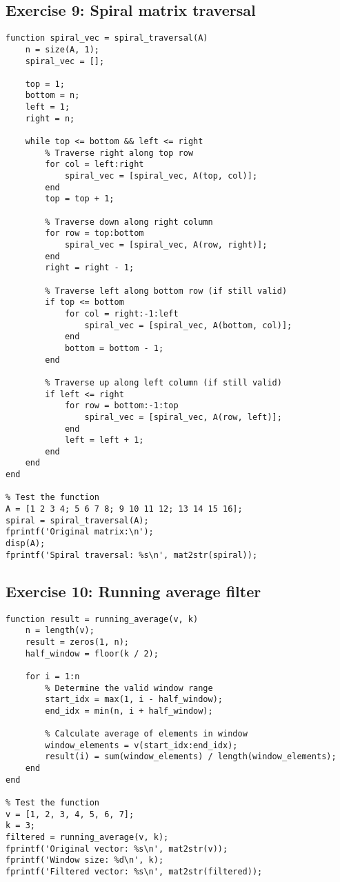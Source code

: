 \documentclass[oneside]{article}
\begin{document}
\subsection*{Exercise 9: Spiral matrix traversal}

\begin{verbatim}
function spiral_vec = spiral_traversal(A)
    n = size(A, 1);
    spiral_vec = [];
    
    top = 1;
    bottom = n;
    left = 1;
    right = n;
    
    while top <= bottom && left <= right
        % Traverse right along top row
        for col = left:right
            spiral_vec = [spiral_vec, A(top, col)];
        end
        top = top + 1;
        
        % Traverse down along right column
        for row = top:bottom
            spiral_vec = [spiral_vec, A(row, right)];
        end
        right = right - 1;
        
        % Traverse left along bottom row (if still valid)
        if top <= bottom
            for col = right:-1:left
                spiral_vec = [spiral_vec, A(bottom, col)];
            end
            bottom = bottom - 1;
        end
        
        % Traverse up along left column (if still valid)
        if left <= right
            for row = bottom:-1:top
                spiral_vec = [spiral_vec, A(row, left)];
            end
            left = left + 1;
        end
    end
end

% Test the function
A = [1 2 3 4; 5 6 7 8; 9 10 11 12; 13 14 15 16];
spiral = spiral_traversal(A);
fprintf('Original matrix:\n');
disp(A);
fprintf('Spiral traversal: %s\n', mat2str(spiral));
\end{verbatim}

\subsection*{Exercise 10: Running average filter}

\begin{verbatim}
function result = running_average(v, k)
    n = length(v);
    result = zeros(1, n);
    half_window = floor(k / 2);
    
    for i = 1:n
        % Determine the valid window range
        start_idx = max(1, i - half_window);
        end_idx = min(n, i + half_window);
        
        % Calculate average of elements in window
        window_elements = v(start_idx:end_idx);
        result(i) = sum(window_elements) / length(window_elements);
    end
end

% Test the function
v = [1, 2, 3, 4, 5, 6, 7];
k = 3;
filtered = running_average(v, k);
fprintf('Original vector: %s\n', mat2str(v));
fprintf('Window size: %d\n', k);
fprintf('Filtered vector: %s\n', mat2str(filtered));
\end{verbatim}
\end{document}
